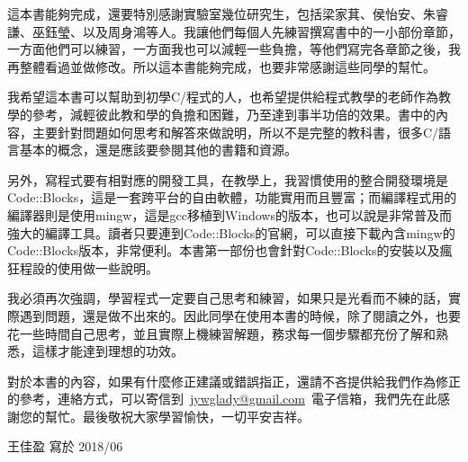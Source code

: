 這本書能夠完成，還要特別感謝實驗室幾位研究生，包括梁家萁、侯怡安、朱睿謙、巫鈺瑩、以及周身鴻等人。我讓他們每個人先練習撰寫書中的一小部份章節，一方面他們可以練習，一方面我也可以減輕一些負擔，等他們寫完各章節之後，我再整體看過並做修改。所以這本書能夠完成，也要非常感謝這些同學的幫忙。

我希望這本書可以幫助到初學C/\cc{}程式的人，也希望提供給程式教學的老師作為教學的參考，減輕彼此教和學的負擔和困難，乃至達到事半功倍的效果。書中的內容，主要針對問題如何思考和解答來做說明，所以不是完整的教科書，很多C/\cc{}語言基本的概念，還是應該要參閱其他的書籍和資源。

另外，寫程式要有相對應的開發工具，在教學上，我習慣使用的整合開發環境是Code::Blocks，這是一套跨平台的自由軟體，功能實用而且豐富；而編譯程式用的編譯器則是使用mingw，這是gcc移植到Windows的版本，也可以說是非常普及而強大的編譯工具。讀者只要連到Code::Blocks的官網，可以直接下載內含mingw的Code::Blocks版本，非常便利。本書第一部份也會針對Code::Blocks的安裝以及瘋狂程設的使用做一些說明。

我必須再次強調，學習程式一定要自己思考和練習，如果只是光看而不練的話，實際遇到問題，還是做不出來的。因此同學在使用本書的時候，除了閱讀之外，也要花一些時間自己思考，並且實際上機練習解題，務求每一個步驟都充份了解和熟悉，這樣才能達到理想的功效。

對於本書的內容，如果有什麼修正建議或錯誤指正，還請不吝提供給我們作為修正的參考，連絡方式，可以寄信到\ \href{mailto:jywglady@gmail.com}{jywglady@gmail.com}\ 電子信箱，我們先在此感謝您的幫忙。最後敬祝大家學習愉快，一切平安吉祥。

\begin{flushright}
	王佳盈 寫於 2018/06
\end{flushright}
